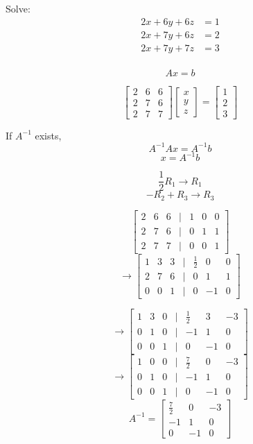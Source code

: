 \begin{example}
	Solve:
	\begin{align*}
		2x + 6y + 6z &= 1 \\
		2x + 7y + 6z &= 2 \\
		2x + 7y + 7z &= 3 \\
	\end{align*}

	\[Ax = b\]

	\[\begin{bmatrix} 2 & 6 & 6 \\ 2 & 7 & 6 \\ 2 & 7 & 7 \end{bmatrix} \begin{bmatrix} x \\ y \\ z \end{bmatrix} = \begin{bmatrix} 1 \\ 2 \\ 3  \end{bmatrix} \]

	If $A^{-1}$ exists, \[A^{-1} Ax = A^{-1}b\]
	\[x = A^{-1}b\]

	\[ \frac{1}{2} R_1 \to R_1\]
	\[-R_2 + R_3 \to R_3\]

	\[\begin{bmatrix} 2 & 6 & 6 & | & 1& 0 & 0 \\ 2 & 7 & 6 &  | & 0 & 1 & 1 \\ 2 & 7 & 7 & | & 0 & 0 & 1 \end{bmatrix} \]
	\[\to \begin{bmatrix} 1 & 3 & 3 & | & \frac{1}{2}& 0 & 0 \\ 2 & 7 & 6 &  | & 0 & 1 & 1 \\ 0 & 0 & 1 & | & 0 & -1 & 0 \end{bmatrix} \]

	\[\to \begin{bmatrix} 1 & 3 & 0 & | & \frac{1}{2}& 3 & -3 \\ 0 & 1 & 0 &  | & -1 & 1 & 0 \\ 0 & 0 & 1 & | & 0 & -1 & 0 \end{bmatrix} \]
	\[\to \begin{bmatrix} 1 & 0 & 0 & | & \frac{7}{2}& 0 & -3 \\ 0 & 1 & 0 &  | & -1 & 1 & 0 \\ 0 & 0 & 1 & | & 0 & -1 & 0 \end{bmatrix} \]
	\[A^{-1} = \begin{bmatrix} \frac{7}{2} & 0 & -3 \\ -1 & 1 & 0 \\ 0 & -1 & 0 \end{bmatrix} \]


\end{example}

